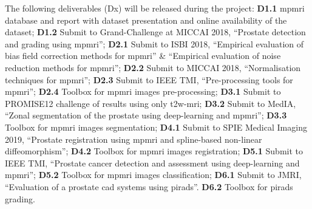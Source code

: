 The following deliverables (Dx) will be released during the project:
\textbf{D1.1} \ac{mpmri} database and report with dataset presentation and online availability of the dataset;
\textbf{D1.2} Submit to Grand-Challenge at MICCAI 2018, ``Prostate detection and grading using \ac{mpmri}'';
\textbf{D2.1} Submit to ISBI 2018, ``Empirical evaluation of bias field correction methods for \ac{mpmri}'' \& ``Empirical evaluation of noise reduction methods for \ac{mpmri}'';
\textbf{D2.2} Submit to MICCAI 2018, ``Normalisation techniques for \ac{mpmri}'';
\textbf{D2.3} Submit to IEEE TMI, ``Pre-processing tools for \ac{mpmri}'';
\textbf{D2.4} Toolbox for \ac{mpmri} images pre-processing;
\textbf{D3.1} Submit to PROMISE12 challenge of results using only \ac{t2w}-\ac{mri};
\textbf{D3.2} Submit to MedIA, ``Zonal segmentation of the prostate using deep-learning and \ac{mpmri}'';
\textbf{D3.3} Toolbox for \ac{mpmri} images segmentation;
\textbf{D4.1} Submit to SPIE Medical Imaging 2019, ``Prostate registration using \ac{mpmri} and spline-based non-linear diffeomorphism'';
\textbf{D4.2} Toolbox for \ac{mpmri} images registration;
\textbf{D5.1} Submit to IEEE TMI, ``Prostate cancer detection and assessment using deep-learning and \ac{mpmri}'';
\textbf{D5.2} Toolbox for \ac{mpmri} images classification;
\textbf{D6.1} Submit to JMRI, ``Evaluation of a prostate \ac{cad} systems using \ac{pirads}''.
\textbf{D6.2} Toolbox for \ac{pirads} grading.

